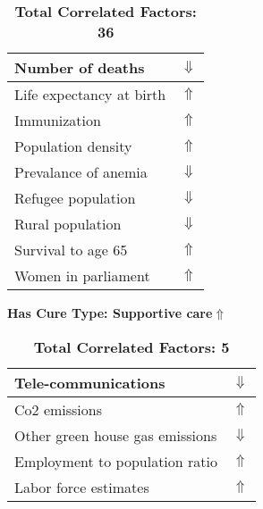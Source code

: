 \documentclass[12pt,notitlepage,oneside]{report}
\begin{document}
\begin{table}[!htb]
\begin{tabular}{|l|l|}
Number of deaths & $\Downarrow$\\ \hline
Life expectancy at birth & $\Uparrow$\\ \hline
Immunization & $\Uparrow$\\ \hline
Population density & $\Uparrow$\\ \hline
Prevalance of anemia & $\Downarrow$\\ \hline
Refugee population & $\Downarrow$\\ \hline
Rural population & $\Downarrow$\\ \hline
Survival to age 65 & $\Uparrow$\\ \hline
Women in parliament & $\Uparrow$\\ \hline
\end{tabular}
\caption*{\textbf{Total Correlated Factors: 36}}
\end{table}
\clearpage
\begin{table}[!htb]
\caption{\textbf{Has Cure Type: Supportive care$ \Uparrow$}}
\centering
\label{Correlated Socio-economic Factors0}
\begin{tabular}{|l|l|}
\hline
Tele-communications & $\Downarrow$\\ \hline
Co2 emissions & $\Uparrow$\\ \hline
Other green house gas emissions & $\Downarrow$\\ \hline
Employment to population ratio & $\Uparrow$\\ \hline
Labor force estimates & $\Uparrow$\\ \hline
\end{tabular}
\caption*{\textbf{Total Correlated Factors: 5}}
\end{table}
\end{document}
